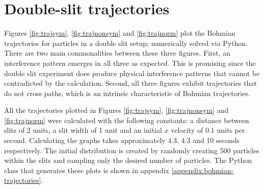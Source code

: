 \documentclass[10pt, reqno]{article}
\begin{document}
\section{Double-slit trajectories}

  Figures \ref{fig:trajsym}, \ref{fig:trajnonsym} and \ref{fig:trajnorm} plot the Bohmian trajectories for particles in a double slit setup; 
    numerically solved via Python.
  There are two main commonalities between these three figures.
  First, an interference pattern emerges in all three as expected. 
  This is promising since the double slit experiment does produce physical interference patterns that cannot be contradicted by the calculation.
  Second, all three figures exhibit trajectories that do not cross paths, which is an intrinsic characteristic of Bohmian trajectories.

  All the trajectories plotted in Figures \ref{fig:trajsym}, \ref{fig:trajnonsym} and \ref{fig:trajnorm} were calculated with the following constants:
    a distance between slits of 2 units, a slit width of 1 unit and an initial $x$ velocity of 0.1 units per second.
  Calculating the graphs takes approximately 4.3, 4.3 and 10 seconds respectively.
  The initial distribution is created by randomly creating 500 particles within the slits and sampling only the desired number of particles. 
  The Python class that generates these plots is shown in appendix \ref{appendix:bohmian-trajectories}.
\end{document}
